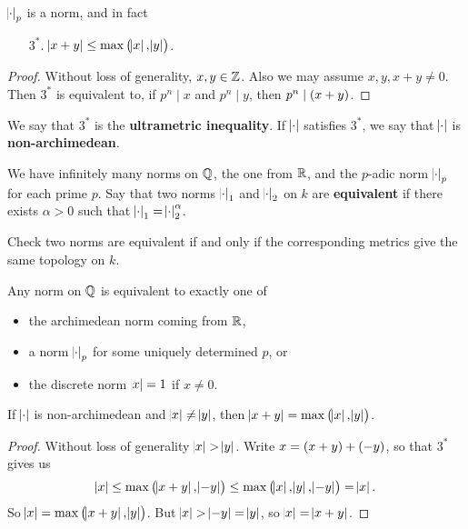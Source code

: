 \begin{lemma}
$ \abs{\cdot}_p $ is a norm, and in fact
\begin{enumerate}
\item[$ 3^* $.] $ \abs{x + y} \le \max\br{\abs{x}, \abs{y}} $.
\end{enumerate}
\end{lemma}

\begin{proof}
Without loss of generality, $ x, y \in \mathbb{Z} $. Also we may assume $ x, y, x + y \ne 0 $. Then $ 3^* $ is equivalent to, if $ p^n \mid x $ and $ p^n \mid y $, then $ p^n \mid \br{x + y} $.
\end{proof}

\begin{definition}
We say that $ 3^* $ is the \textbf{ultrametric inequality}. If $ \abs{\cdot} $ satisfies $ 3^* $, we say that $ \abs{\cdot} $ is \textbf{non-archimedean}.
\end{definition}

We have infinitely many norms on $ \mathbb{Q} $, the one from $ \mathbb{R} $, and the $ p $-adic norm $ \abs{\cdot}_p $ for each prime $ p $. Say that two norms $ \abs{\cdot}_1 $ and $ \abs{\cdot}_2 $ on $ k $ are \textbf{equivalent} if there exists $ \alpha > 0 $ such that $ \abs{\cdot}_1 = \abs{\cdot}_2^\alpha $.

\begin{exercise*}
Check two norms are equivalent if and only if the corresponding metrics give the same topology on $ k $.
\end{exercise*}

\begin{theorem}
Any norm on $ \mathbb{Q} $ is equivalent to exactly one of
\begin{itemize}
\item the archimedean norm coming from $ \mathbb{R} $,
\item a norm $ \abs{\cdot}_p $ for some uniquely determined $ p $, or
\item the discrete norm $ \abs{x} = 1 $ if $ x \ne 0 $.
\end{itemize}
\end{theorem}

\begin{lemma}
\label{lem:2.7}
If $ \abs{\cdot} $ is non-archimedean and $ \abs{x} \ne \abs{y} $, then $ \abs{x + y} = \max\br{\abs{x}, \abs{y}} $.
\end{lemma}

\begin{proof}
Without loss of generality $ \abs{x} > \abs{y} $. Write $ x = \br{x + y} + \br{-y} $, so that $ 3^* $ gives us
$$ \abs{x} \le \max\br{\abs{x + y}, \abs{-y}} \le \max\br{\abs{x}, \abs{y}, \abs{-y}} = \abs{x}. $$
So $ \abs{x} = \max\br{\abs{x + y}, \abs{y}} $. But $ \abs{x} > \abs{-y} = \abs{y} $, so $ \abs{x} = \abs{x + y} $.
\end{proof}

